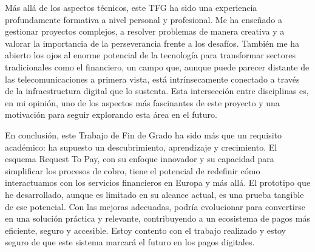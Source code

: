 Más allá de los aspectos técnicos, este TFG ha sido una experiencia profundamente formativa a nivel personal y profesional. Me ha enseñado a gestionar proyectos complejos, a resolver problemas de manera creativa y a valorar la importancia de la perseverancia frente a los desafíos. También me ha abierto los ojos al enorme potencial de la tecnología para transformar sectores tradicionales como el financiero, un campo que, aunque puede parecer distante de las telecomunicaciones a primera vista, está intrínsecamente conectado a través de la infraestructura digital que lo sustenta. Esta intersección entre disciplinas es, en mi opinión, uno de los aspectos más fascinantes de este proyecto y una motivación para seguir explorando esta área en el futuro.

En conclusión, este Trabajo de Fin de Grado ha sido más que un requisito académico: ha supuesto un descubrimiento, aprendizaje y crecimiento. El esquema Request To Pay, con su enfoque innovador y su capacidad para simplificar los procesos de cobro, tiene el potencial de redefinir cómo interactuamos con los servicios financieros en Europa y más allá. El prototipo que he desarrollado, aunque es limitado en su alcance actual, es una prueba tangible de ese potencial. Con las mejoras adecuadas, podría evolucionar para convertirse en una solución práctica y relevante, contribuyendo a un ecosistema de pagos más eficiente, seguro y accesible. Estoy contento con el trabajo realizado y estoy seguro de que este sistema marcará el futuro en los pagos digitales.

